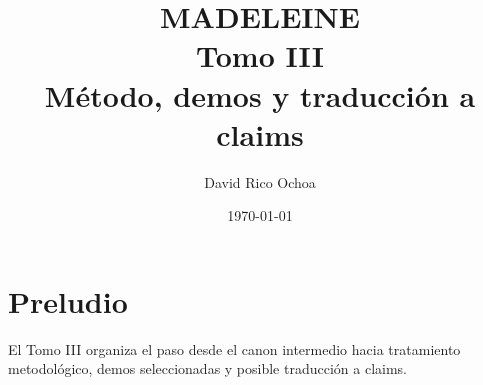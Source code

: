 \documentclass[11pt,oneside]{book}
\begin{document}
\frontmatter
\title{MADELEINE \\ Tomo III \\ Método, demos y traducción a claims}
\author{David Rico Ochoa}
\date{\today}
\maketitle
\tableofcontents
\mainmatter

\chapter{Preludio}
El Tomo III organiza el paso desde el canon intermedio hacia tratamiento metodológico, demos seleccionadas y posible traducción a claims.



























\printbibliography[heading=bibintoc,title={Referencias}]
\end{document}
